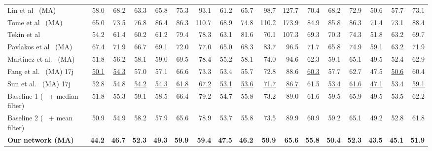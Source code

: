 \documentclass[runningheads]{llncs}
\begin{document}
\begin{table}
{\begin{tabular}{@{}lrrrrrrrrrrrrrrrr@{}}
Lin et al~\cite{linCVPR17RPSM} (MA) & 58.0 & 68.2 & 63.3 & 65.8 & 75.3 & 93.1 & 61.2  & 65.7 & 98.7 & 127.7 & 70.4 & 68.2 & 72.9 & 50.6 & 57.7 & 73.1\\
Tome et al~\cite{tome2017lifting} (MA)  & 65.0 & 73.5 & 76.8 & 86.4 & 86.3 & 110.7 & 68.9  & 74.8 & 110.2 & 173.9 & 84.9 & 85.8 & 86.3 & 71.4 & 73.1 & 88.4\\
Tekin et al~\cite{tekin2017learning} & 54.2 & 61.4 & 60.2 & 61.2 & 79.4 & 78.3 & 63.1 & 81.6 & 70.1 & 107.3 & 69.3 & 70.3 & 74.3 & 51.8 & 63.2 & 69.7\\
Pavlakos et al~\cite{volumetric} (MA) & 67.4 & 71.9 & 66.7 & 69.1 & 72.0 & 77.0 & 65.0 & 68.3 & 83.7 & 96.5 & 71.7 & 65.8 & 74.9 & 59.1 & 63.2 & 71.9\\
Martinez et al.~\cite{JMartinez:ICCV:2017} (MA) & 51.8&  56.2&	58.1&	59.0&	69.5&	78.4&	55.2&	58.1&	74.0&	94.6&	62.3&	59.1&	65.1&	49.5&	52.4&	62.9\\ 
Fang et al.~\cite{fang2017learning} (MA) 17j  & \underline{50.1} & \underline{54.3} & 57.0 & 57.1 & 66.6 & 73.3 & 53.4 & 55.7 & 72.8 & 88.6 & \underline{60.3} & 57.7 & 62.7 & 47.5 & \underline{50.6} & 60.4\\
Sun et al.~\cite{sun2017compositional} (MA) 17j  & 52.8 & 54.8 & \underline{54.2} &\underline {54.3} & \underline{61.8} & \underline{67.2} & \underline{53.1} & \underline{53.6} & \underline{71.7} & \underline{86.7} & 61.5 & \underline{53.4} & \underline{61.6}  & \underline{47.1} & 53.4 & \underline{59.1}\\
\hline
Baseline 1 (~\cite{JMartinez:ICCV:2017} + median filter)  & 51.8& 	55.3& 	59.1& 	58.5& 	66.4& 	79.2& 	54.7& 	55.8& 	73.2& 	89.0& 	61.6& 	59.5& 	65.9& 	49.5& 	53.5& 	62.2\\
Baseline 2 (~\cite{JMartinez:ICCV:2017} + mean filter)  & 50.9 &  54.9& 58.2 &	57.9& 65.6 &	78.9&	53.7&	55.8&	73.5&	89.9& 60.9 & 59.2 &	65.1& 49.2 &	52.8& 61.8 \\ 
\textbf{Our network (MA)} & \bf{44.2}&  \bf{46.7}&	\bf{52.3}&	\bf{49.3}&	\bf{59.9}&	\bf{59.4}&	\bf{47.5}&	\bf{46.2}&	\bf{59.9}&	\bf{65.6}&	\bf{55.8}&	\bf{50.4}&	\bf{52.3}&	\bf{43.5}&	\bf{45.1}&	\bf{51.9}\\


\end{tabular}}
\end{table}
\end{document}
